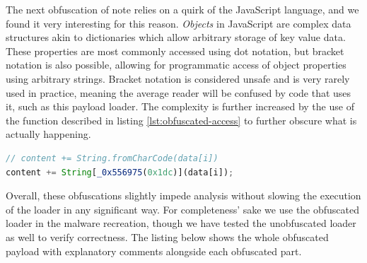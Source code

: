 The next obfuscation of note relies on a quirk of the JavaScript language, and we found it very interesting for this
reason. \emph{Objects} in JavaScript are complex data structures akin to dictionaries which allow arbitrary storage of
key value data. These properties are most commonly accessed using dot notation, but bracket notation is also possible,
allowing for programmatic access of object properties using arbitrary strings. Bracket notation is considered unsafe and 
is very rarely used in practice, meaning the average reader will be confused by code that uses it, such as this payload
loader. The complexity is further increased by the use of the function described in listing \ref{lst:obfuscated-access} 
to further obscure what is actually happening.

\begin{lstlisting}[language=JavaScript, caption={Bracket notation object property access with obfuscated argument.}]
// content += String.fromCharCode(data[i])
content += String[_0x556975(0x1dc)](data[i]); 
\end{lstlisting}

Overall, these obfuscations slightly impede analysis without slowing the execution of the loader in any significant way.
For completeness' sake we use the obfuscated loader in the malware recreation, though we have tested the unobfuscated
loader as well to verify correctness. The listing below shows the whole obfuscated payload with explanatory comments
alongside each obfuscated part.


